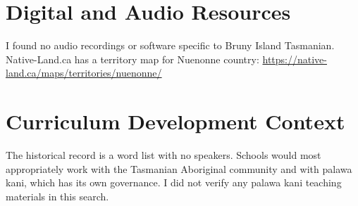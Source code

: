 \documentclass[12pt]{article}
\begin{document}
\section{Digital and Audio Resources}
I found no audio recordings or software specific to Bruny Island Tasmanian. Native-Land.ca has a territory map for Nuenonne country: \url{https://native-land.ca/maps/territories/nuenonne/}

\section{Curriculum Development Context}
The historical record is a word list with no speakers. Schools would most appropriately work with the Tasmanian Aboriginal community and with palawa kani, which has its own governance. I did not verify any palawa kani teaching materials in this search.
\end{document}
